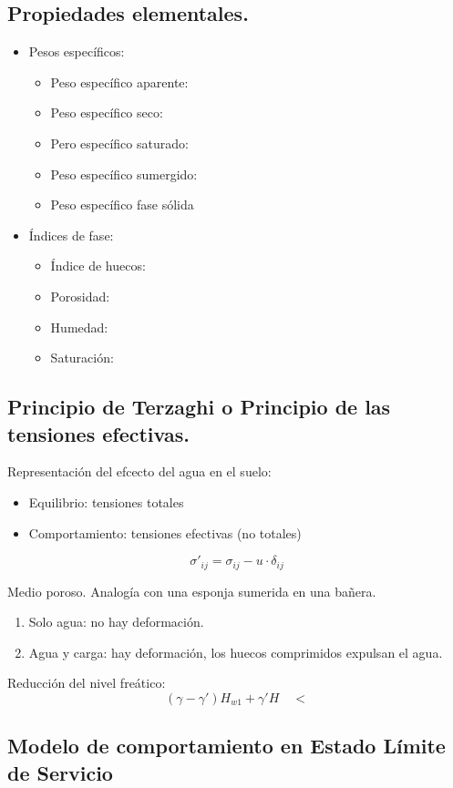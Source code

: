 \subsection{Propiedades elementales.}
\begin{itemize}
    \item Pesos específicos:
    \begin{itemize}
        \item Peso específico aparente:
        \item Peso específico seco:
        \item Pero específico saturado:
        \item Peso específico sumergido:
        \item Peso específico fase sólida
    \end{itemize}
    \item Índices de fase:
    \begin{itemize}
        \item Índice de huecos:
        \item Porosidad:
        \item Humedad:
        \item Saturación:
    \end{itemize}
\end{itemize}

\subsection{Principio de Terzaghi o Principio de las tensiones efectivas.}
Representación del efcecto del agua en el suelo:
\begin{itemize}
    \item Equilibrio: tensiones totales
    \item Comportamiento: tensiones efectivas (no totales)
\end{itemize}
\[\sigma'_{ij} = \sigma_{ij} - u \cdot \delta_{ij}\]

Medio poroso. Analogía con una esponja sumerida en una bañera.
\begin{enumerate}
    \item Solo agua: no hay deformación.
    \item Agua y carga: hay deformación, los huecos comprimidos expulsan el agua.
\end{enumerate}

Reducción del nivel freático:
\[(\gamma - \gamma') H_{w1} + \gamma' H \quad < \]

\subsection{Modelo de comportamiento en Estado Límite de Servicio}
